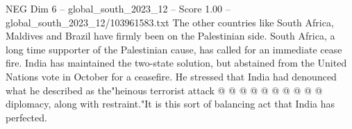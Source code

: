 \begin{textsample}{NEG Dim 6 – global\_south\_2023\_12 – Score 1.00 – global\_south\_2023\_12/103961583.txt}
The other countries like South Africa, Maldives and Brazil have firmly been on the Palestinian side.
South Africa, a long time supporter of the Palestinian cause, has called for an immediate cease fire.
India has maintained the two-state solution, but abstained from the United Nations vote in October for a ceasefire.
He stressed that India had denounced what he described as the"heinous terrorist attack @ @ @ @ @ @ @ @ @ @ diplomacy, along with restraint."It is this sort of balancing act that India has perfected.

\end{textsample}

